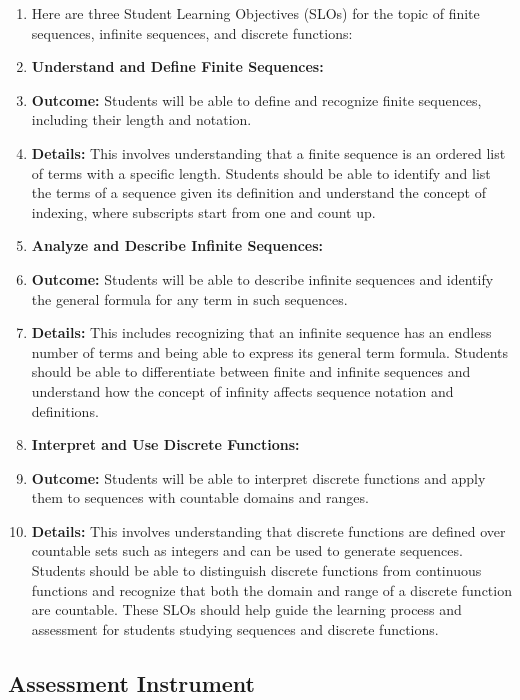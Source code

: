 \begin{enumerate}
    \item Here are three Student Learning Objectives (SLOs) for the topic of finite sequences, infinite sequences, and discrete functions:
    \item \textbf{Understand and Define Finite Sequences:}
    \item \textbf{Outcome:} Students will be able to define and recognize finite sequences, including their length and notation.
    \item \textbf{Details:} This involves understanding that a finite sequence is an ordered list of terms with a specific length. Students should be able to identify and list the terms of a sequence given its definition and understand the concept of indexing, where subscripts start from one and count up.
    \item \textbf{Analyze and Describe Infinite Sequences:}
    \item \textbf{Outcome:} Students will be able to describe infinite sequences and identify the general formula for any term in such sequences.
    \item \textbf{Details:} This includes recognizing that an infinite sequence has an endless number of terms and being able to express its general term formula. Students should be able to differentiate between finite and infinite sequences and understand how the concept of infinity affects sequence notation and definitions.
    \item \textbf{Interpret and Use Discrete Functions:}
    \item \textbf{Outcome:} Students will be able to interpret discrete functions and apply them to sequences with countable domains and ranges.
    \item \textbf{Details:} This involves understanding that discrete functions are defined over countable sets such as integers and can be used to generate sequences. Students should be able to distinguish discrete functions from continuous functions and recognize that both the domain and range of a discrete function are countable. These SLOs should help guide the learning process and assessment for students studying sequences and discrete functions.
\end{enumerate}

\subsection{Assessment Instrument}
\label{ssec:sequ-6e01}

